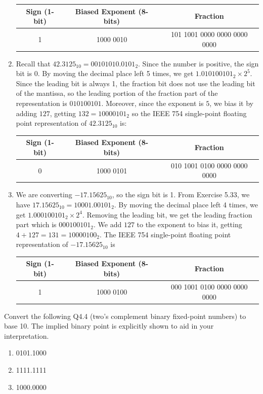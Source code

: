 \documentclass[12pt]{article}
\newenvironment{ex}[2][Exercise]{\begin{trivlist}
		\item[\hskip \labelsep {\bfseries #1}\hskip \labelsep {\bfseries #2.}]}{\end{trivlist}}
\newenvironment{sol}[1][Solution]{\begin{trivlist}
		\item[\hskip \labelsep {\bfseries #1:}]}{\end{trivlist}}
\begin{document}
\begin{sol}
\begin{enumerate}[label=(\alph*)]
		\begin{center}
			\begin{tabular}{c|c|c}
				Sign (1-bit) & Biased Exponent (8-bits) & Fraction\\
				\hline
				1 & 1000 0010 & 101 1001 0000 0000 0000 0000
			\end{tabular}
		\end{center}
		\item Recall that $42.3125_{10}=0010 1010.0101_2$. Since the number is
		positive, the sign bit is 0. By moving the decimal place left 5 times,
		we get $1.010100101_2\times 2^5$. Since the leading bit is always 1, the fraction
		bit does not use the leading bit of the mantissa, so the leading portion
		of the fraction part of the representation is $010100101$. Moreover,
		since the exponent is $5$, we bias it by adding $127$, getting $132=1000 0101_2$
		so the IEEE 754 single-point floating point representation of $42.3125_{10}$
		is:
		\begin{center}
			\begin{tabular}{c|c|c}
				Sign (1-bit) & Biased Exponent (8-bits) & Fraction\\
				\hline
				0 & 1000 0101 & 010 1001 0100 0000 0000 0000
			\end{tabular}
		\end{center}
		\item We are converting  $-17.15625_{10}$, so the sign bit is 1.
		From Exercise 5.33, we have $17.15625_{10}=10001.00101_2$. By moving
		the decimal place left 4 times, we get $1.000100101_2\times 2^4$. Removing
		the leading bit, we get the leading fraction part which is $000 1001 01_2$.
		We add $127$ to the exponent to bias it, getting $4+127=131=1000 0100_2$.
		The IEEE 754 single-point floating point representation of $-17.15625_{10}$ is
		\begin{center}
			\begin{tabular}{c|c|c}
				Sign (1-bit) & Biased Exponent (8-bits) & Fraction\\
				\hline
				1 & 1000 0100 & 000 1001 0100 0000 0000 0000
			\end{tabular}
		\end{center}
	\end{enumerate}
	
\end{sol}

\begin{ex}{5.39}
	Convert the following Q4.4 (two's complement binary fixed-point numbers)
	to base 10. The implied binary point is explicitly shown to aid in your
	interpretation.
	\begin{enumerate}[label=(\alph*)]
		\item 0101.1000
		\item 1111.1111
		\item 1000.0000
	\end{enumerate}
\end{ex}
\end{document}
